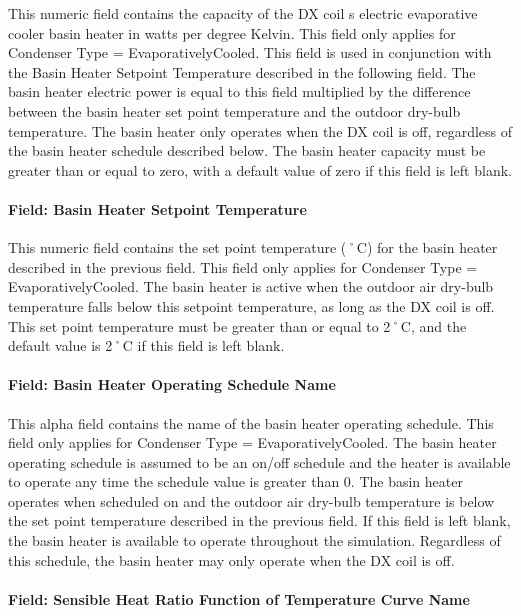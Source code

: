 This numeric field contains the capacity of the DX coil s electric evaporative cooler basin heater in watts per degree Kelvin. This field only applies for Condenser Type = EvaporativelyCooled. This field is used in conjunction with the Basin Heater Setpoint Temperature described in the following field. The basin heater electric power is equal to this field multiplied by the difference between the basin heater set point temperature and the outdoor dry-bulb temperature. The basin heater only operates when the DX coil is off, regardless of the basin heater schedule described below. The basin heater capacity must be greater than or equal to zero, with a default value of zero if this field is left blank.

\paragraph{Field: Basin Heater Setpoint Temperature}\label{field-basin-heater-setpoint-temperature-1-000}

This numeric field contains the set point temperature (˚C) for the basin heater described in the previous field. This field only applies for Condenser Type = EvaporativelyCooled. The basin heater is active when the outdoor air dry-bulb temperature falls below this setpoint temperature, as long as the DX coil is off. This set point temperature must be greater than or equal to 2˚C, and the default value is 2˚C if this field is left blank.

\paragraph{Field: Basin Heater Operating Schedule Name}\label{field-basin-heater-operating-schedule-name-1-000}

This alpha field contains the name of the basin heater operating schedule. This field only applies for Condenser Type = EvaporativelyCooled. The basin heater operating schedule is assumed to be an on/off schedule and the heater is available to operate any time the schedule value is greater than 0. The basin heater operates when scheduled on and the outdoor air dry-bulb temperature is below the set point temperature described in the previous field. If this field is left blank, the basin heater is available to operate throughout the simulation. Regardless of this schedule, the basin heater may only operate when the DX coil is off.

\paragraph{Field: Sensible Heat Ratio Function of Temperature Curve Name}\label{field-sensible-heat-ratio-function-of-temperature-curve-name-1}

